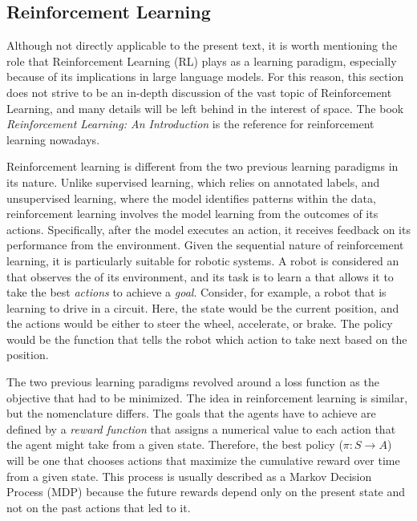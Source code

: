 \subsection{Reinforcement Learning}
Although not directly applicable to the present text, it is worth mentioning the role that Reinforcement Learning (RL) plays as a learning paradigm, especially because of its implications in large language models. For this reason, this section does not strive to be an in-depth discussion of the vast topic of Reinforcement Learning, and many details will be left behind in the interest of space. The book \textit{Reinforcement Learning: An Introduction} is the reference for reinforcement learning nowadays.

Reinforcement learning is different from the two previous learning paradigms in its nature. Unlike supervised learning, which relies on annotated labels, and unsupervised learning, where the model identifies patterns within the data, reinforcement learning involves the model learning from the outcomes of its actions. Specifically, after the model executes an action, it receives feedback on its performance from the environment. Given the sequential nature of reinforcement learning, it is particularly suitable for robotic systems. A robot is considered an \textit{} that observes the \textit{} of its environment, and its task is to learn a \textit{} that allows it to take the best \textit{actions} to achieve a \textit{goal}. Consider, for example, a robot that is learning to drive in a circuit. Here, the state would be the current position, and the actions would be either to steer the wheel, accelerate, or brake. The policy would be the function that tells the robot which action to take next based on the position.

The two previous learning paradigms revolved around a loss function as the objective that had to be minimized. The idea in reinforcement learning is similar, but the nomenclature differs. The goals that the agents have to achieve are defined by a \textit{reward function} that assigns a numerical value to each action that the agent might take from a given state. Therefore, the best policy ($\pi: S \rightarrow A$) will be one that chooses actions that maximize the cumulative reward over time from a given state. This process is usually described as a Markov Decision Process (MDP) because the future rewards depend only on the present state and not on the past actions that led to it.

